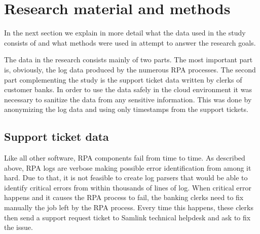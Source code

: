 \documentclass[english, 12pt, a4paper, elec, utf8, a-1b, online]{aaltothesis}
\begin{document}



\clearpage




\section{Research material and methods}\label{sec:research-material-and-methods}

In the next section
we explain in more detail
what the data used in the study
consists of
and what methods were used
in attempt to answer the research goals.

The data in the research consists mainly of two parts.
The most important part is, obviously,
the log data produced by the numerous RPA processes.
The second part complementing the study
is the support ticket data written by clerks of customer banks.
In order to use the data safely in the cloud environment
it was necessary to sanitize the data
from any sensitive information.
This was done by anonymizing the log data
and using only timestamps from the support tickets.

\subsection{Support ticket data}\label{subsec:efecte-ticket-data}

Like all other software,
RPA components fail from time to time.
As described above, %
RPA logs are verbose
making possible error identification from among it hard.
Due to that,
it is not feasible to create log parsers
that would be able to identify critical errors
from within thousands of lines of log.
When critical error happens
and it causes the RPA process to fail,
the banking clerks need to fix manually
the job left by the RPA process.
Every time this happens,
these clerks then send a support request ticket
to Samlink technical helpdesk
and ask to fix the issue.
\end{document}
